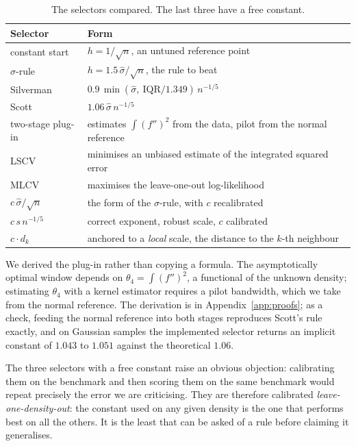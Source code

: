 \documentclass[11pt]{article}
\newcommand{\shat}{\hat{\sigma}}
\begin{document}
\begin{table}[H]
\centering
\begin{tabular}{@{}ll@{}}
\toprule
\textbf{Selector} & \textbf{Form} \\
\midrule
constant start & $h = 1/\sqrt{n}$, an untuned reference point \\
$\sigma$-rule & $h = 1.5\,\shat/\sqrt{n}$, the rule to beat \\
Silverman & $0.9\,\min(\shat,\ \mathrm{IQR}/1.349)\, n^{-1/5}$ \\
Scott & $1.06\,\shat\, n^{-1/5}$ \\
two-stage plug-in & estimates $\int (f'')^2$ from the data, pilot from the normal reference \\
LSCV & minimises an unbiased estimate of the integrated squared error \\
MLCV & maximises the leave-one-out log-likelihood \\
$c\,\shat/\sqrt{n}$ & the form of the $\sigma$-rule, with $c$ recalibrated \\
$c\,s\,n^{-1/5}$ & correct exponent, robust scale, $c$ calibrated \\
$c \cdot d_k$ & anchored to a \emph{local} scale, the distance to the $k$-th neighbour \\
\bottomrule
\end{tabular}
\caption{The selectors compared. The last three have a free constant.}
\label{tab:selectors}
\end{table}

We derived the plug-in rather than copying a formula. The asymptotically optimal window
depends on $\theta_4 = \int (f'')^2$, a functional of the
unknown density; estimating $\theta_4$ with a kernel estimator requires a pilot bandwidth,
which we take from the normal reference. The derivation is in
Appendix~\ref{app:proofs}; as a check, feeding the normal reference into both stages
reproduces Scott's rule exactly, and on Gaussian samples the implemented selector returns an
implicit constant of $1.043$ to $1.051$ against the theoretical $1.06$.

The three selectors with a free constant raise an obvious objection: calibrating them on the
benchmark and then scoring them on the same benchmark would repeat precisely the error we
are criticising. They are therefore calibrated \emph{leave-one-density-out}: the constant
used on any given density is the one that performs best on all the others. It is the least
that can be asked of a rule before claiming it generalises.
\end{document}
